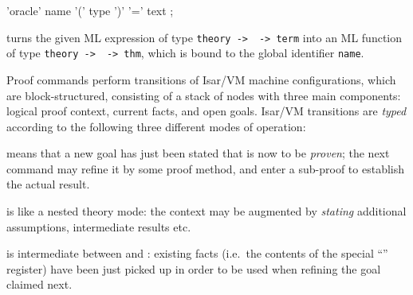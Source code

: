 \begin{isabellebody}
\begin{isamarkuptext}
  \begin{rail}
    'oracle' name '(' type ')' '=' text
    ;
  \end{rail}

  \begin{descr}

  \item [\mbox{\isa{\isacommand{oracle}}}~\isa{name\ {\isacharparenleft}type{\isacharparenright}\ {\isacharequal}\ text}] turns the
  given ML expression  of type
  \verb|theory ->|~~\verb|-> term| into an
  ML function of type
  \verb|theory ->|~~\verb|-> thm|, which is
  bound to the global identifier \verb|name|.

  \end{descr}%
\end{isamarkuptext}%
\isamarkuptrue%
%
\isamarkuptrue%
%
\begin{isamarkuptext}%
Proof commands perform transitions of Isar/VM machine
  configurations, which are block-structured, consisting of a stack of
  nodes with three main components: logical proof context, current
  facts, and open goals.  Isar/VM transitions are \emph{typed}
  according to the following three different modes of operation:

  \begin{descr}

  \item [\isa{proof{\isacharparenleft}prove{\isacharparenright}}] means that a new goal has just been
  stated that is now to be \emph{proven}; the next command may refine
  it by some proof method, and enter a sub-proof to establish the
  actual result.

  \item [\isa{proof{\isacharparenleft}state{\isacharparenright}}] is like a nested theory mode: the
  context may be augmented by \emph{stating} additional assumptions,
  intermediate results etc.

  \item [\isa{proof{\isacharparenleft}chain{\isacharparenright}}] is intermediate between  and : existing facts (i.e.\
  the contents of the special ``\mbox{}'' register) have been
  just picked up in order to be used when refining the goal claimed
  next.

  \end{descr}


\end{isamarkuptext}
\end{isabellebody}
